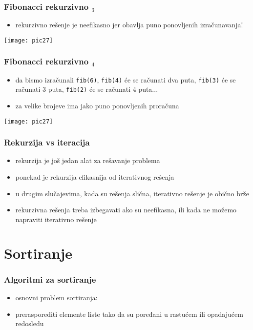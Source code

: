 \documentclass[utf8,compress,aspectratio=169]{beamer}
\begin{document}
\begin{frame}[fragile]
  \frametitle{Fibonacci rekurzivno $_3$}
  \begin{itemize}
    \item rekurzivno rešenje je neefikasno jer obavlja puno ponovljenih izračunavanja!
  \end{itemize}
\begin{center}
  \texttt{[image: pic27]}
\end{center}
\end{frame}

\begin{frame}[fragile]
  \frametitle{Fibonacci rekurzivno $_4$}
  \begin{itemize}
    \item da bismo izračunali \texttt{fib(6)}, \texttt{fib(4)} će se računati dva puta,
      \texttt{fib(3)} će se računati 3 puta, \texttt{fib(2)} će se računati 4 puta...
    \item za velike brojeve ima jako puno ponovljenih proračuna
  \end{itemize}
\begin{center}
  \texttt{[image: pic27]}
\end{center}
\end{frame}

\begin{frame}[fragile]
  \frametitle{Rekurzija vs iteracija}
  \begin{itemize}
    \item rekurzija je još jedan alat za rešavanje problema
    \item ponekad je rekurzija efikasnija od iterativnog rešenja
    \item u drugim slučajevima, kada su rešenja slična, iterativno rešenje je obično brže
    \item rekurzivna rešenja treba izbegavati ako su neefikasna, ili kada ne možemo napraviti iterativno rešenje
  \end{itemize}
\end{frame}

\section{Sortiranje}

\begin{frame}[fragile]
  \frametitle{Algoritmi za sortiranje}
  \begin{itemize}
    \item osnovni problem sortiranja:
    \item prerasporediti elemente liste tako da su poređani u rastućem ili opadajućem redosledu
  \end{itemize}
\end{frame}
\end{document}
